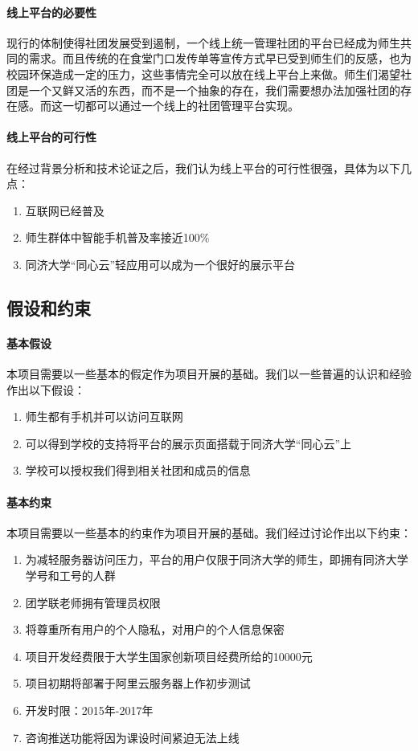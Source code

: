 \documentclass[UTF8]{ctexart}
\begin{document}
\paragraph{线上平台的必要性}
现行的体制使得社团发展受到遏制，一个线上统一管理社团的平台已经成为师生共同的需求。而且传统的在食堂门口发传单等宣传方式早已受到师生们的反感，也为校园环保造成一定的压力，这些事情完全可以放在线上平台上来做。师生们渴望社团是一个又鲜又活的东西，而不是一个抽象的存在，我们需要想办法加强社团的存在感。而这一切都可以通过一个线上的社团管理平台实现。

\paragraph{线上平台的可行性}
在经过背景分析和技术论证之后，我们认为线上平台的可行性很强，具体为以下几点：

\begin{enumerate}[1)]
\item 互联网已经普及
\item 师生群体中智能手机普及率接近100\%
\item 同济大学“同心云”轻应用可以成为一个很好的展示平台
\end{enumerate}

\subsection{假设和约束}
\paragraph{基本假设}本项目需要以一些基本的假定作为项目开展的基础。我们以一些普遍的认识和经验作出以下假设：

\begin{enumerate}[1)]
\item 师生都有手机并可以访问互联网
\item 可以得到学校的支持将平台的展示页面搭载于同济大学“同心云”上
\item 学校可以授权我们得到相关社团和成员的信息
\end{enumerate}

\paragraph{基本约束}
本项目需要以一些基本的约束作为项目开展的基础。我们经过讨论作出以下约束：

\begin{enumerate}[1)]
\item 为减轻服务器访问压力，平台的用户仅限于同济大学的师生，即拥有同济大学学号和工号的人群
\item 团学联老师拥有管理员权限
\item 将尊重所有用户的个人隐私，对用户的个人信息保密
\item 项目开发经费限于大学生国家创新项目经费所给的10000元
\item 项目初期将部署于阿里云服务器上作初步测试
\item 开发时限：2015年-2017年
\item 咨询推送功能将因为课设时间紧迫无法上线
\end{enumerate}
\end{document}
